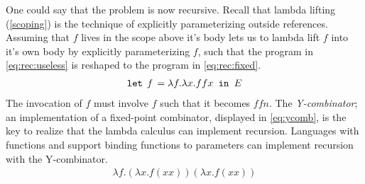 One could say that the problem is now recursive.
Recall that lambda lifting (\autoref{scoping}) is the technique of explicitly parameterizing outside references.
Assuming that $f$ lives in the scope above it's body lets us to lambda lift $f$ into it's own body by explicitly parameterizing $f$, such that the program in \autoref{eq:rec:useless} is reshaped to the program in \autoref{eq:rec:fixed}.
\begin{align}
  \texttt{let } \textit{f } = \lambda f.\lambda x. f f x \texttt{ in } E\label{eq:rec:fixed}
\end{align}
The invocation of $f$ must involve $f$ such that it becomes $f f n$.
The \textit{Y-combinator}; an implementation of a fixed-point combinator, displayed in \autoref{eq:ycomb}, is the key to realize that the lambda calculus can implement recursion.
Languages with functions and support binding functions to parameters can implement recursion with the Y-combinator.
\begin{align}
    \lambda f . (\lambda x . f (x x)) (\lambda x . f (x x))
    \label{eq:ycomb}
\end{align}

